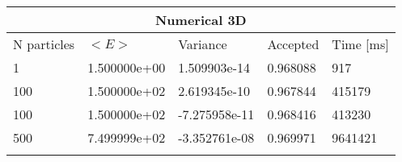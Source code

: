 \begin{tabular}{|l|l|l|l|l|}
\hline 
\multicolumn{5}{|c|}{Numerical 3D}\\ 
\hline 
N particles & $<E>$ & Variance & Accepted & Time [ms]\\ 
 \hline 
1 & 1.500000e+00 & 1.509903e-14 & 0.968088 & 917 \\ \hline 
100 & 1.500000e+02 & 2.619345e-10 & 0.967844 & 415179 \\ \hline 
100 & 1.500000e+02 & -7.275958e-11 & 0.968416 & 413230 \\ \hline 
500 & 7.499999e+02 & -3.352761e-08 & 0.969971 & 9641421 \\ \hline 
\label{h:n3} 
\end{tabular}